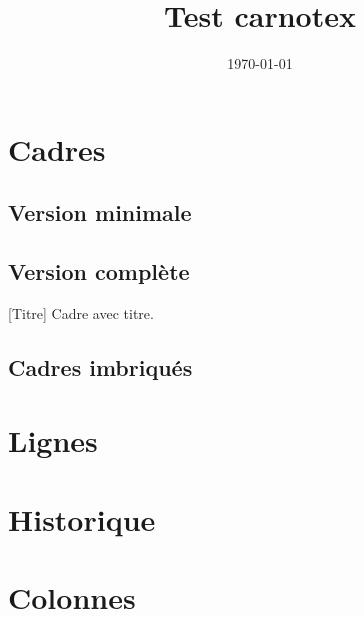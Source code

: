\documentclass[a4paper,11pt]{article}
\title{Test carnotex}
\date{\today}
\begin{document}
%
\maketitle

\section{Cadres}

\subsection{Version minimale}


\subsection{Version complète}

[Titre]{
Cadre avec titre.
}

\subsection{Cadres imbriqués}


\section{Lignes}




\section{Historique}


\section{Colonnes}
\end{document}

